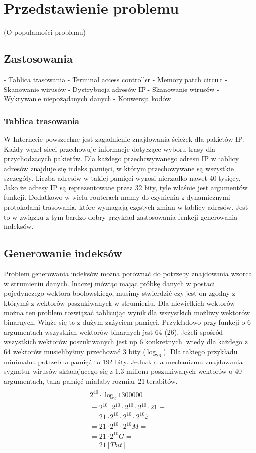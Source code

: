 \chapter{Przedstawienie problemu}
(O popularności problemu)

\section{Zastosowania}
- Tablica trasowania
- Terminal access controller
- Memory patch circuit
- Skanowanie wirusów
- Dystrybucja adresów IP
- Skanowanie wirusów
- Wykrywanie niepożądanych danych
- Konwersja kodów

\subsection{Tablica trasowania}
W Internecie powszechne jest zagadnienie znajdowania ścieżek dla pakietów IP.
Każdy węzeł sieci przechowuje informacje dotyczące wyboru trasy dla przychodzących pakietów.
Dla każdego przechowywanego adresu IP w tablicy adresów znajduje się indeks pamięci, w którym przechowywane są wszystkie szczegóły.
Liczba adresów w takiej pamięci wynosi nierzadko nawet 40 tysięcy.
Jako że adresy IP są reprezentowane przez 32 bity, tyle właśnie jest argumentów funkcji.
Dodatkowo w wielu routerach mamy do czynienia z dynamicznymi protokołami trasowania, które wymagają częstych zmian w tablicy adresów.
Jest to w związku z tym bardzo dobry przykład zastosowania funkcji generowania indeksów.

\section{Generowanie indeksów}

Problem generowania indeksów można porównać do potrzeby znajdowania wzorca w strumieniu danych.
Inaczej mówiąc mając próbkę danych w postaci pojedynczego wektora boolowskiego, musimy stwierdzić czy jest on zgodny z którymś z wektorów poszukiwanych w strumieniu.
Dla niewielkich wektorów można ten problem rozwiązać tablicując wynik dla wszystkich możliwy wektorów binarnych.
Wiąże się to z dużym zużyciem pamięci.
Przykładowo przy funkcji o 6 argumentach wszystkich wektorów binarnych jest 64 (26).
Jeżeli spośród wszystkich wektorów poszukiwanych jest np 6 konkretnych, wtedy dla każdego z 64 wektorów musielibyśmy przechować 3 bity ($\log_26$).
Dla takiego przykładu minimalna potrzebna pamięć to 192 bity.
Jednak dla mechanizmu znajdowania sygnatur wirusów składającego się z 1.3 miliona poszukiwanych wektorów o 40 argumentach, taka pamięć miałaby rozmiar 21 terabitów.
\begin{multline} \\
2^{40} \cdot \log_2 1300000 = \\
= 2^{10} \cdot 2^{10} \cdot 2^{10} \cdot 2^{10} \cdot 21 = \\
=21 \cdot 2^{10} \cdot 2^{10} \cdot 2^{10} k = \\
=21 \cdot 2^{10} \cdot 2^{10} M = \\
=21 \cdot 2^{10} G = \\
=21 [Tbit] \\
\end{multline}

